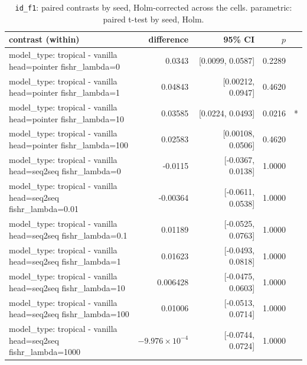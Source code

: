\documentclass[10pt]{article}
\makeatletter
\newcommand{\stackcell}[1]{\begin{tabular}[t]{@{}l@{}}#1\end{tabular}}
\makeatother
\begin{document}
{\small
\begin{longtable}{lrrrl}
\caption{\texttt{id\_f1}: paired contrasts by seed, Holm-corrected across the cells. parametric: paired t-test by seed, Holm.}\label{tab:paired-id_f1}\\
\toprule
contrast (within) & difference & 95\% CI & $p$ & \\
\midrule
\endhead
\stackcell{model\_type: tropical - vanilla\\\footnotesize head=pointer fishr\_lambda=0 } & 0.0343 & [0.0099, 0.0587] & 0.2289 & \\
\stackcell{model\_type: tropical - vanilla\\\footnotesize head=pointer fishr\_lambda=1 } & 0.04843 & [0.00212, 0.0947] & 0.4620 & \\
\stackcell{model\_type: tropical - vanilla\\\footnotesize head=pointer fishr\_lambda=10 } & 0.03585 & [0.0224, 0.0493] & 0.0216 & *\\
\stackcell{model\_type: tropical - vanilla\\\footnotesize head=pointer fishr\_lambda=100 } & 0.02583 & [0.00108, 0.0506] & 0.4620 & \\
\stackcell{model\_type: tropical - vanilla\\\footnotesize head=seq2seq fishr\_lambda=0 } & -0.0115 & [-0.0367, 0.0138] & 1.0000 & \\
\stackcell{model\_type: tropical - vanilla\\\footnotesize head=seq2seq fishr\_lambda=0.01 } & -0.00364 & [-0.0611, 0.0538] & 1.0000 & \\
\stackcell{model\_type: tropical - vanilla\\\footnotesize head=seq2seq fishr\_lambda=0.1 } & 0.01189 & [-0.0525, 0.0763] & 1.0000 & \\
\stackcell{model\_type: tropical - vanilla\\\footnotesize head=seq2seq fishr\_lambda=1 } & 0.01623 & [-0.0493, 0.0818] & 1.0000 & \\
\stackcell{model\_type: tropical - vanilla\\\footnotesize head=seq2seq fishr\_lambda=10 } & 0.006428 & [-0.0475, 0.0603] & 1.0000 & \\
\stackcell{model\_type: tropical - vanilla\\\footnotesize head=seq2seq fishr\_lambda=100 } & 0.01006 & [-0.0513, 0.0714] & 1.0000 & \\
\stackcell{model\_type: tropical - vanilla\\\footnotesize head=seq2seq fishr\_lambda=1000 } & $-9.976\times10^{-4}$ & [-0.0744, 0.0724] & 1.0000 & \\

\end{longtable}}
\end{document}
